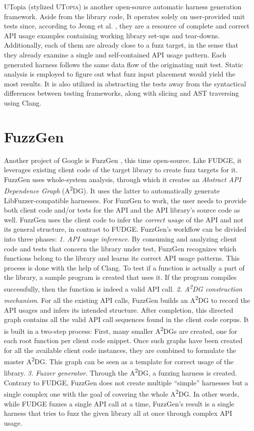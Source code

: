 \documentclass[
  a4paper,
]{scrreprt}
\theoremstyle{definition}
\theoremstyle{remark}
\begin{document}
UTopia \autocite{utopia} (stylized \textsc{UTopia}) is another
open-source automatic harness generation framework. Aside from the
library code, It operates solely on user-provided unit tests since,
according to Jeong et al. \autocite{utopia}, they are a resource of
complete and correct API usage examples containing working library
set-ups and tear-downs. Additionally, each of them are already close to
a fuzz target, in the sense that they already examine a single and
self-contained API usage pattern. Each generated harness follows the
same data flow of the originating unit test. Static analysis is employed
to figure out what fuzz input placement would yield the most results. It
is also utilized in abstracting the tests away from the syntactical
differences between testing frameworks, along with slicing and AST
traversing using Clang.

\section{FuzzGen}\label{fuzzgen}

Another project of Google is FuzzGen \autocite{fuzzgen}, this time
open-source. Like FUDGE, it leverages existing client code of the target
library to create fuzz targets for it. FuzzGen uses whole-system
analysis, through which it creates an \emph{Abstract API Dependence
Graph} (A\textsuperscript{2}DG). It uses the latter to automatically
generate LibFuzzer-compatible harnesses. For FuzzGen to work, the user
needs to provide both client code and/or tests for the API and the API
library's source code as well. FuzzGen uses the client code to infer the
\emph{correct usage} of the API and not its general structure, in
contrast to FUDGE. FuzzGen's workflow can be divided into three phases:
\emph{1. API usage inference}. By consuming and analyzing client code
and tests that concern the library under test, FuzzGen recognizes which
functions belong to the library and learns its correct API usage
patterns. This process is done with the help of Clang. To test if a
function is actually a part of the library, a sample program is created
that uses it. If the program compiles successfully, then the function is
indeed a valid API call. \emph{2. A\textsuperscript{2}DG construction
mechanism}. For all the existing API calls, FuzzGen builds an
A\textsuperscript{2}DG to record the API usages and infers its intended
structure. After completion, this directed graph contains all the valid
API call sequences found in the client code corpus. It is built in a
two-step process: First, many smaller A\textsuperscript{2}DGs are
created, one for each root function per client code snippet. Once such
graphs have been created for all the available client code instances,
they are combined to formulate the master A\textsuperscript{2}DG. This
graph can be seen as a template for correct usage of the library.
\emph{3. Fuzzer generator}. Through the A\textsuperscript{2}DG, a
fuzzing harness is created. Contrary to FUDGE, FuzzGen does not create
multiple ``simple'' harnesses but a single complex one with the goal of
covering the whole A\textsuperscript{2}DG. In other words, while FUDGE
fuzzes a single API call at a time, FuzzGen's result is a single harness
that tries to fuzz the given library all at once through complex API
usage.
\end{document}
